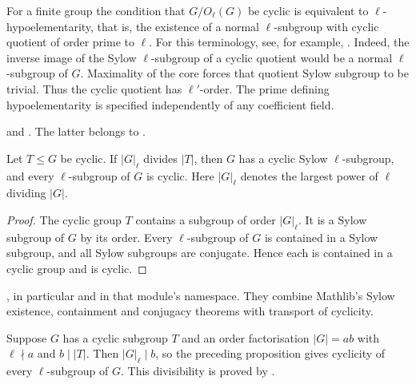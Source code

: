 For a finite group the condition that $G/O_\ell(G)$ be cyclic is
equivalent to $\ell$-hypoelementarity, that is, the existence of a normal
$\ell$-subgroup with cyclic quotient of order prime to $\ell$.
For this terminology, see, for example,
\cite[Definition~5.5.3]{Benson1998}. Indeed, the inverse image of the
Sylow $\ell$-subgroup of a cyclic quotient would be a normal
$\ell$-subgroup of $G$. Maximality of the core forces that quotient
Sylow subgroup to be trivial. Thus the cyclic quotient has $\ell'$-order.
The prime defining hypoelementarity is specified independently of any
coefficient field.
\begin{implementation}
 and
.
The latter belongs to .
\end{implementation}

\begin{proposition}
\label{lib:groups:cyclic-sylow}
Let $T\leq G$ be cyclic. If $|G|_\ell$ divides $|T|$, then $G$ has
a cyclic Sylow $\ell$-subgroup, and every $\ell$-subgroup of $G$ is cyclic.
Here $|G|_\ell$ denotes the largest power of $\ell$ dividing $|G|$.
\end{proposition}
\begin{proof}
The cyclic group $T$ contains a subgroup of order $|G|_\ell$. It is a
Sylow subgroup of $G$ by its order. Every $\ell$-subgroup of $G$ is
contained in a Sylow subgroup, and all Sylow subgroups are conjugate.
Hence each is contained in a cyclic group and is cyclic.
\end{proof}
\begin{implementation}
, in particular
 and
in that module's namespace. They combine Mathlib's Sylow existence,
containment and conjugacy theorems with transport of cyclicity.
\end{implementation}

\begin{example}
Suppose $G$ has a cyclic subgroup $T$ and an order
factorisation $|G|=ab$ with $\ell\nmid a$ and $b\mid |T|$.
Then $|G|_\ell\mid b$, so the preceding proposition gives cyclicity of
every $\ell$-subgroup of $G$. This divisibility is proved by
.
\end{example}
